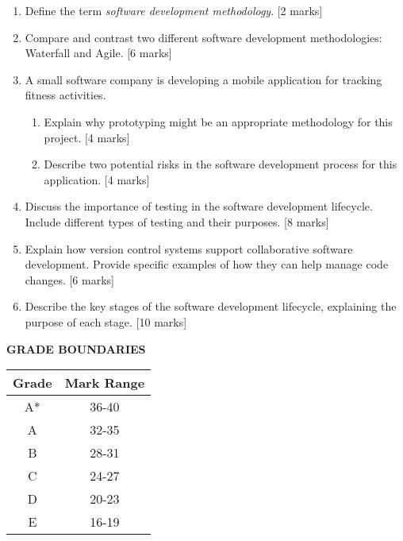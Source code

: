 \documentclass[12pt]{article}
\begin{document}
\begin{enumerate}
\item Define the term \textit{software development methodology}. [2 marks]

\item Compare and contrast two different software development methodologies: Waterfall and Agile. [6 marks]

\item A small software company is developing a mobile application for tracking fitness activities. 
    \begin{enumerate}[label=(\alph*)]
    \item Explain why prototyping might be an appropriate methodology for this project. [4 marks]
    \item Describe two potential risks in the software development process for this application. [4 marks]
    \end{enumerate}

\item Discuss the importance of testing in the software development lifecycle. Include different types of testing and their purposes. [8 marks]

\item Explain how version control systems support collaborative software development. Provide specific examples of how they can help manage code changes. [6 marks]

\item Describe the key stages of the software development lifecycle, explaining the purpose of each stage. [10 marks]
\end{enumerate}

\newpage

\begin{center}
\textbf{GRADE BOUNDARIES}
\begin{tabular}{|c|c|}
\hline
Grade & Mark Range \\
\hline
A* & 36-40 \\
A & 32-35 \\
B & 28-31 \\
C & 24-27 \\
D & 20-23 \\
E & 16-19 \\
\end{tabular}
\end{center}
\end{document}
